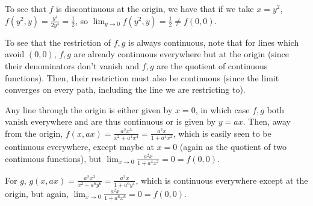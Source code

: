 \documentclass[12pt,letterpaper]{article}
\theoremstyle{definition}
\begin{document}
To see that $f$ is discontinuous at the origin, we have that if we take $x = y^{2}$, $f(y^{2},y) = \frac{y^{4}}{2y^{4}} = \frac{1}{2}$, so $\lim_{y \rightarrow 0}f(y^{2},y) = \frac{1}{2} \neq f(0,0)$.

To see that the restriction of $f,g$ is always continuous, note that for lines which avoid $(0,0)$, $f,g$ are already continuous everywhere but at the origin (since their denominators don't vanish and $f,g$ are the quotient of continuous functions). Then, their restriction must also be continuous (since the limit converges on every path, including the line we are restricting to).

Any line through the origin is either given by $x = 0$, in which case $f,g$ both vanish everywhere and are thus continuous or is given by $y = ax$. Then, away from the origin, $f(x,ax) = \frac{a^{2}x^{3}}{x^{2}+a^{4}x^{4}} = \frac{a^{2}x}{1 + a^{4}x^{2}}$, which is easily seen to be continuous everywhere,  except maybe at $x = 0$ (again as the quotient of two continuous functions), but $\lim_{x \rightarrow 0}\frac{a^{2}x}{1+a^{4}x^{2}} = 0 = f(0,0)$.

For $g$, $g(x,ax) = \frac{a^{2}x^{3}}{x^{2}+a^{6}y^{6}} = \frac{a^{2}x}{1 + a^{6}y^{4}}$, which is continuous everywhere except at the origin, but again, $\lim_{x \rightarrow 0}\frac{a^{2}x}{1+a^{6}x^{6}} = 0 = f(0,0)$.
\end{document}
